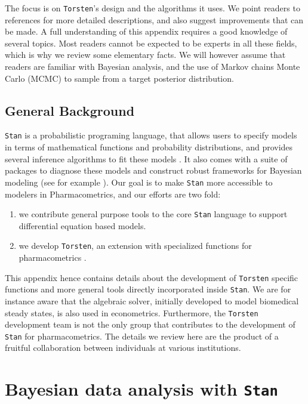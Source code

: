\documentclass[11pt]{article}
\begin{document}
  The focus is on \texttt{Torsten}'s design and the algorithms it uses. We point readers
  to references for more detailed descriptions, and also suggest improvements
  that can be made.
  A full understanding of this appendix requires a good knowledge of several topics.
  Most readers cannot be expected to be experts in all these fields, which is
  why we review some elementary facts. We will however assume that readers are familiar
  with Bayesian analysis, and the use of Markov chains Monte Carlo (MCMC) to sample from
  a target posterior distribution.
  
  \subsection{General Background}
  
  \texttt{Stan} is a probabilistic programing language, that allows users to specify models
  in terms of mathematical functions and probability distributions,
  and provides several inference algorithms to fit these models \cite{Stan:2017}.
  It also comes with a suite of packages to diagnose these models
  and construct robust frameworks for Bayesian modeling (see for example
  \cite{Gabry:2017}).
  Our goal is to make \texttt{Stan} more accessible to modelers in Pharmacometrics,
  and our efforts are two fold:
  \begin{enumerate}
    \item we contribute general purpose tools to the core \texttt{Stan} language to support
    differential equation based models.
    \item we develop \texttt{Torsten}, an extension with specialized functions for pharmacometrics
    \cite{Gillespie:2018, Margossian:2016}.
  \end{enumerate}
  
  This appendix hence contains details about the development of \texttt{Torsten} specific functions
  and more general tools directly incorporated inside \texttt{Stan}.
  We are for instance aware that the algebraic solver, initially developed to model biomedical steady
  states, is also used in econometrics.
  Furthermore, the \texttt{Torsten} development team is not the only group that contributes to the development of
  \texttt{Stan} for pharmacometrics. The details we review here are the product of a fruitful collaboration
  between individuals at various institutions.
  
  \section{Bayesian data analysis with \texttt{Stan}}
  
\end{document}

